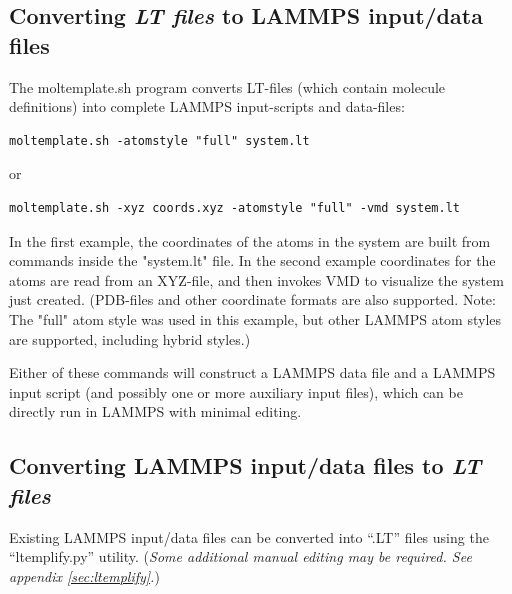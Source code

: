 \documentclass[11pt]{article}
\begin{document}
%
%

\subsection{Converting \textit{LT files} to LAMMPS input/data files}
The moltemplate.sh program converts LT-files (which contain 
molecule definitions) into complete LAMMPS input-scripts and data-files:
\begin{verbatim}
moltemplate.sh -atomstyle "full" system.lt
\end{verbatim}
     or
\begin{verbatim}
moltemplate.sh -xyz coords.xyz -atomstyle "full" -vmd system.lt
\end{verbatim}
In the first example, the coordinates of the atoms in the 
system are built from commands inside the "system.lt" file.
In the second example coordinates for the atoms are read from an XYZ-file,
and then invokes VMD to visualize the system just created. 
(PDB-files and other coordinate formats are also supported.
Note: The "full" atom style was used in this example, but other
LAMMPS atom styles are supported, including hybrid styles.)

Either of these commands will construct a LAMMPS data file and a 
LAMMPS input script (and possibly one or more auxiliary input files),
which can be directly run in LAMMPS with minimal editing.


\subsection{Converting LAMMPS input/data files to \textit{LT files}}
Existing LAMMPS input/data files can be converted into 
``.LT'' files using the ``ltemplify.py'' utility. 
(\textit{Some additional manual editing may be required. 
 See appendix \ref{sec:ltemplify}.})
\end{document}

